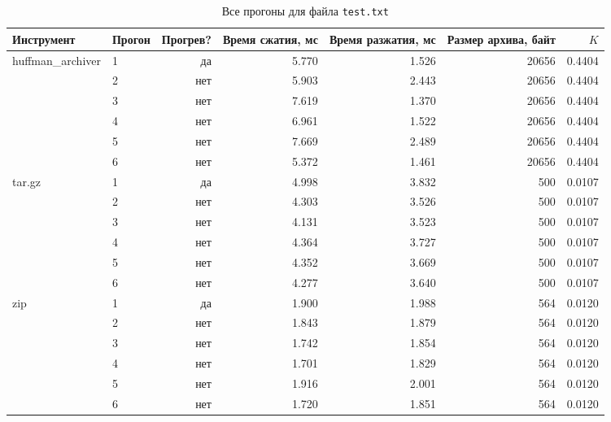 \documentclass[a4paper]{article}
\begin{document}
\begin{table}[h]
\centering
\caption{Все прогоны для файла \texttt{test.txt}}
\label{tab:bench_test}
\footnotesize
\begin{tabular}{@{}llrrrrr@{}}
\toprule
Инструмент & Прогон & Прогрев? & Время сжатия, мс & Время разжатия, мс & Размер архива, байт & \(K\) \\
\midrule
huffman\_archiver & 1 & да  & 5.770 & 1.526 & 20656 & 0.4404 \\
        & 2 & нет & 5.903 & 2.443 & 20656 & 0.4404 \\
        & 3 & нет & 7.619 & 1.370 & 20656 & 0.4404 \\
        & 4 & нет & 6.961 & 1.522 & 20656 & 0.4404 \\
        & 5 & нет & 7.669 & 2.489 & 20656 & 0.4404 \\
        & 6 & нет & 5.372 & 1.461 & 20656 & 0.4404 \\
\addlinespace
tar.gz  & 1 & да  & 4.998 & 3.832 & 500 & 0.0107 \\
        & 2 & нет & 4.303 & 3.526 & 500 & 0.0107 \\
        & 3 & нет & 4.131 & 3.523 & 500 & 0.0107 \\
        & 4 & нет & 4.364 & 3.727 & 500 & 0.0107 \\
        & 5 & нет & 4.352 & 3.669 & 500 & 0.0107 \\
        & 6 & нет & 4.277 & 3.640 & 500 & 0.0107 \\
\addlinespace
zip     & 1 & да  & 1.900 & 1.988 & 564 & 0.0120 \\
        & 2 & нет & 1.843 & 1.879 & 564 & 0.0120 \\
        & 3 & нет & 1.742 & 1.854 & 564 & 0.0120 \\
        & 4 & нет & 1.701 & 1.829 & 564 & 0.0120 \\
        & 5 & нет & 1.916 & 2.001 & 564 & 0.0120 \\
        & 6 & нет & 1.720 & 1.851 & 564 & 0.0120 \\
\bottomrule
\end{tabular}
\end{table}
\end{document}
